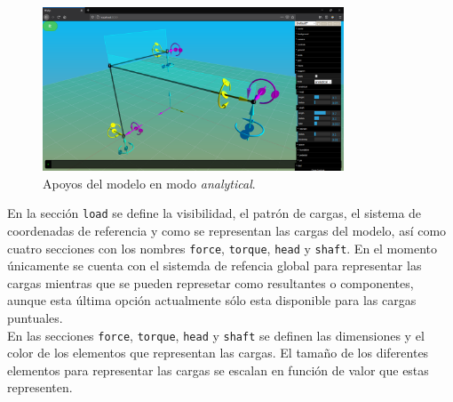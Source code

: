 \begin{figure}[ht]
  \centering
  \includegraphics[width=0.8\textwidth]{introduction/dat-gui-support.png}
  \caption{Apoyos del modelo en modo \emph{analytical}.}
  \label{fig:dat.gui-support}
\end{figure}

En la sección \verb|load| se define la visibilidad, el patrón de cargas, el sistema de coordenadas de referencia y como se representan las cargas del modelo, así como cuatro secciones con los nombres \verb|force|, \verb|torque|, \verb|head| y \verb|shaft|. En el momento únicamente se cuenta con el sistemda de refencia global para representar las cargas mientras que se pueden represetar como resultantes o componentes, aunque esta última opción actualmente sólo esta disponible para las cargas puntuales.\\

En las secciones \verb|force|, \verb|torque|, \verb|head| y \verb|shaft| se definen las dimensiones y el color de los elementos que representan las cargas. El tamaño de los diferentes elementos para representar las cargas se escalan en función de valor que estas representen.\\